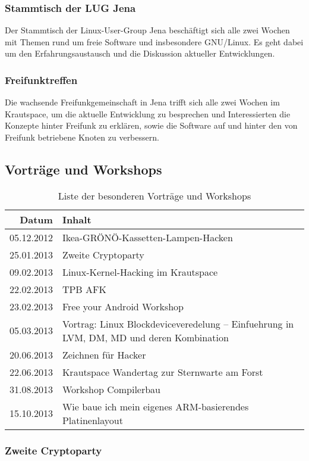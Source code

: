 \documentclass[10pt,DIV16]{scrartcl}
\begin{document}
\subsubsection{Stammtisch der LUG Jena}

Der Stammtisch der Linux-User-Group Jena beschäftigt sich alle zwei Wochen
mit Themen rund um freie Software und insbesondere GNU/Linux. Es geht dabei
um den Erfahrungsaustausch und die Diskussion aktueller Entwicklungen.

\subsubsection{Freifunktreffen}

Die wachsende Freifunkgemeinschaft in Jena trifft sich alle zwei Wochen
im Krautspace, um die aktuelle Entwicklung zu besprechen und
Interessierten die Konzepte hinter Freifunk zu erklären, sowie die
Software auf und hinter den von Freifunk betriebene Knoten zu
verbessern.

\subsection{Vorträge und Workshops}

\begin{table}[h]
\begin{tabular}{r|l}
	\textbf{Datum} & \textbf{Inhalt} \\ \hline{}
	05.12.2012 & Ikea-GRÖNÖ-Kassetten-Lampen-Hacken\\
    25.01.2013 & Zweite Cryptoparty\\
	09.02.2013 & Linux-Kernel-Hacking im Krautspace\\
	22.02.2013 & TPB AFK\\
	23.02.2013 & Free your Android Workshop\\
	05.03.2013 & Vortrag: Linux Blockdeviceveredelung -- Einfuehrung in LVM, DM, MD und deren Kombination\\
	20.06.2013 & Zeichnen für Hacker\\
	22.06.2013 & Krautspace Wandertag zur Sternwarte am Forst\\
	31.08.2013 & Workshop Compilerbau\\
	15.10.2013 & Wie baue ich mein eigenes ARM-basierendes Platinenlayout
	\end{tabular}
	\caption{Liste der besonderen Vorträge und Workshops}
\end{table}

\subsubsection{Zweite Cryptoparty}
\end{document}
